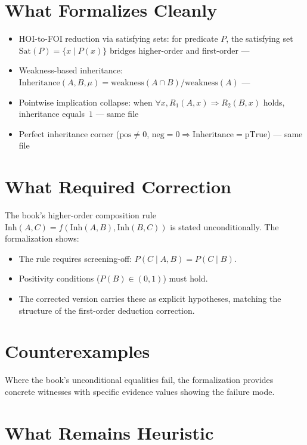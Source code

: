 \documentclass[11pt,openany]{report}
\begin{document}
\section{What Formalizes Cleanly}

\begin{itemize}
\item HOI-to-FOI reduction via satisfying sets: for predicate $P$, the
  satisfying set $\mathrm{Sat}(P) = \{x \mid P(x)\}$ bridges
  higher-order and first-order ---
\item Weakness-based inheritance:
  $\mathrm{Inheritance}(A, B, \mu) = \mathrm{weakness}(A \cap B) / \mathrm{weakness}(A)$
  ---
\item Pointwise implication collapse: when $\forall x, R_1(A,x) \Rightarrow R_2(B,x)$
  holds, inheritance equals~$1$ ---
  same file
\item Perfect inheritance corner ($\mathrm{pos} \ne 0$, $\mathrm{neg} = 0
  \Rightarrow \mathrm{Inheritance} = \mathrm{pTrue}$) ---
  same file
\end{itemize}

\section{What Required Correction}

The book's higher-order composition rule
$\mathrm{Inh}(A,C) = f(\mathrm{Inh}(A,B), \mathrm{Inh}(B,C))$ is
stated unconditionally.  The formalization shows:
\begin{itemize}
\item The rule requires screening-off: $P(C \mid A, B) = P(C \mid B)$.
\item Positivity conditions ($P(B) \in (0,1)$) must hold.
\item The corrected version carries these as explicit hypotheses, matching
  the structure of the first-order deduction correction.
\end{itemize}

\section{Counterexamples}

Where the book's unconditional equalities fail, the formalization provides
concrete witnesses with specific evidence values showing the failure mode.

\section{What Remains Heuristic}
\end{document}
